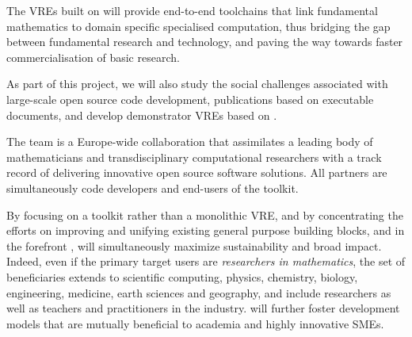 The VREs built on \TheProject will provide end-to-end toolchains that
link fundamental mathematics to domain specific specialised
computation, thus bridging the gap between fundamental research and
technology, and paving the way towards faster commercialisation of
basic research.

As part of this project, we will also study the social challenges
associated with large-scale open source code development, publications based on executable documents, and develop
demonstrator VREs based on \TheProject.

The \TheProject team is a Europe-wide collaboration that assimilates a
leading body of mathematicians and transdisciplinary computational
researchers with a track record of delivering innovative open source
software solutions. All partners are simultaneously code developers and
end-users of the toolkit.

By focusing on a toolkit rather than a monolithic VRE, and by
concentrating the efforts on improving and unifying existing general
purpose building blocks, and in the forefront \Jupyter, \TheProject
will simultaneously maximize sustainability and broad impact. Indeed,
even if the primary target users are \emph{researchers in
  mathematics}, the set of beneficiaries extends to scientific
computing, physics, chemistry, biology, engineering, medicine, earth
sciences and geography, and include researchers as well as teachers
and practitioners in the industry. \TheProject will further foster
development models that are mutually beneficial to academia and highly
innovative SMEs.






\clearpage


